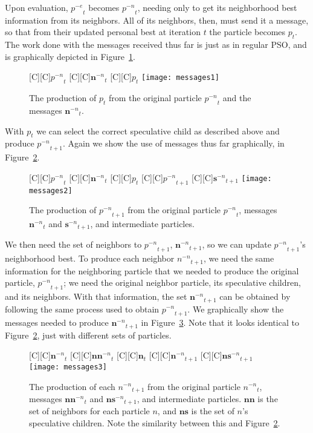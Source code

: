 \documentclass[ms,electronic,twosidetoc,letterpaper,chaptercenter,parttop,equalmargins]{byumsphd}
\newcommand{\fig}[1]{Figure~\ref{fig:#1}}
\providecommand{\noeval}[1]{\ensuremath{#1^{-e}}}
\providecommand{\nonbest}[1]{\ensuremath{#1^{-n}}}
\providecommand{\p}{\ensuremath{p}}
\providecommand{\sset}{\ensuremath{\mathbf{s}}}
\providecommand{\nsset}{\ensuremath{\mathbf{ns}}}
\providecommand{\n}{\ensuremath{n}}
\providecommand{\nset}{\ensuremath{\mathbf{n}}}
\providecommand{\nnset}{\ensuremath{\mathbf{nn}}}
\begin{document}
Upon evaluation, $\noeval{\p}_t$ becomes $\nonbest{\p}_t$, needing only to get
its neighborhood best information from its neighbors.  All of its neighbors,
then, must send it a message, so that from their updated personal best at
iteration $t$ the particle becomes $\p_t$.  The work done with the messages
received thus far is just as in regular PSO, and is graphically depicted in 
\fig{messages1}.

\begin{figure}
  \centering
  [C][C]{$\nonbest{\p}_{t}$}
  [C][C]{$\nonbest{\nset}_{t}$}
  [C][C]{$\p_{t}$}
  \texttt{[image: messages1]}
  \caption{The production of $\p_{t}$ from the original particle
  $\nonbest{\p}_{t}$ and the messages $\nonbest{\nset}_{t}$.}
  \label{fig:messages1}
\end{figure}

With $\p_t$ we can select the correct speculative child as described above and
produce $\nonbest{\p}_{t+1}$.  Again we show the use of messages thus far
graphically, in \fig{messages2}.  

\begin{figure}
  \centering
  [C][C]{$\nonbest{\p}_{t}$}
  [C][C]{$\nonbest{\nset}_{t}$}
  [C][C]{$\p_{t}$}
  [C][C]{$\nonbest{\p}_{t+1}$}
  [C][C]{$\nonbest{\sset}_{t+1}$}
  \texttt{[image: messages2]}
  \caption{The production of $\nonbest{\p}_{t+1}$ from the original particle 
  $\nonbest{\p}_{t}$, messages $\nonbest{\nset}_{t}$ and
  $\nonbest{\sset}_{t+1}$, and intermediate particles.}
  \label{fig:messages2}
\end{figure}

We then need the set of neighbors to $\nonbest{\p}_{t+1}$,
$\nonbest{\nset}_{t+1}$, so we can update $\nonbest{\p}_{t+1}$'s neighborhood
best.  To produce each neighbor $\nonbest{\n}_{t+1}$, we need the same
information for the neighboring particle that we needed to produce the original
particle, $\nonbest{\p}_{t+1}$; we need the original neighbor particle, its
speculative children, and its neighbors.  With that information, the set
$\nonbest{\nset}_{t+1}$ can be obtained by following the same process used to
obtain $\nonbest{\p}_{t+1}$.  We graphically show the messages needed to
produce $\nonbest{\nset}_{t+1}$ in \fig{messages3}.  Note that it looks
identical to \fig{messages2}, just with different sets of particles.

\begin{figure}
  \centering
  [C][C]{$\nonbest{\nset}_{t}$}
  [C][C]{$\nonbest{\nnset}_{t}$}
  [C][C]{$\nset_{t}$}
  [C][C]{$\nonbest{\nset}_{t+1}$}
  [C][C]{$\nonbest{\nsset}_{t+1}$}
  \texttt{[image: messages3]}
  \caption{The production of each $\nonbest{\n}_{t+1}$ from the original
  particle $\nonbest{\n}_{t}$, messages $\nonbest{\nnset}_{t}$ and
  $\nonbest{\nsset}_{t+1}$, and intermediate particles.  $\nnset$ is the set of
  neighbors for each particle $\n$, and $\nsset$ is the set of $\n$'s
  speculative children.  Note the similarity between this and \fig{messages2}.}
  \label{fig:messages3}
\end{figure}
\end{document}
